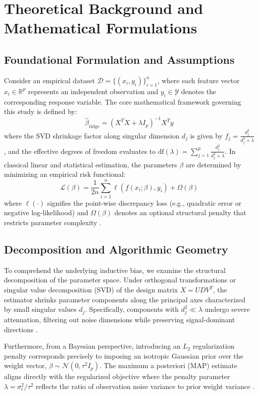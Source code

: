 \section{Theoretical Background and Mathematical Formulations}

\subsection{Foundational Formulation and Assumptions}
Consider an empirical dataset $\mathcal{D} = \{(x_i, y_i)\}_{i=1}^n$, where each feature vector $x_i \in \mathbb{R}^p$ represents an independent observation and $y_i \in \mathcal{Y}$ denotes the corresponding response variable. The core mathematical framework governing this study is defined by:
\begin{equation}
  \hat{\beta}_{\text{ridge}} = (X^T X + \lambda I_p)^{-1} X^T y
\label{eq:core_math}
\end{equation}
where the SVD shrinkage factor along singular dimension $d_j$ is given by $f_j = \frac{d_j^2}{d_j^2 + \lambda}$, and the effective degrees of freedom evaluates to $\text{df}(\lambda) = \sum_{j=1}^p \frac{d_j^2}{d_j^2 + \lambda}$.
In classical linear and statistical estimation, the parameters $\beta$ are determined by minimizing an empirical risk functional:
\begin{equation}
  \mathcal{L}(\beta) = \frac{1}{2n} \sum_{i=1}^n \ell(f(x_i; \beta), y_i) + \Omega(\beta)
\end{equation}
where $\ell(\cdot)$ signifies the point-wise discrepancy loss (e.g., quadratic error or negative log-likelihood) and $\Omega(\beta)$ denotes an optional structural penalty that restricts parameter complexity \cite{bishop2006}.

\subsection{Decomposition and Algorithmic Geometry}
To comprehend the underlying inductive bias, we examine the structural decomposition of the parameter space. Under orthogonal transformations or singular value decomposition (SVD) of the design matrix $X = U D V^T$, the estimator shrinks parameter components along the principal axes characterized by small singular values $d_j$. Specifically, components with $d_j^2 \ll \lambda$ undergo severe attenuation, filtering out noise dimensions while preserving signal-dominant directions \cite{hoerl1970}.

Furthermore, from a Bayesian perspective, introducing an $L_2$ regularization penalty corresponds precisely to imposing an isotropic Gaussian prior over the weight vector, $\beta \sim \mathcal{N}(0, \tau^2 I_p)$. The maximum a posteriori (MAP) estimate aligns directly with the regularized objective where the penalty parameter $\lambda = \sigma_\epsilon^2 / \tau^2$ reflects the ratio of observation noise variance to prior weight variance \cite{murphy2012}.

